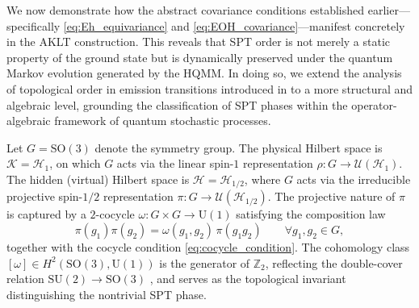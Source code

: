 \documentclass[12pt,a4paper]{article}
\begin{document}
We now demonstrate how the abstract covariance conditions established earlier—specifically \eqref{eq:Eh_equivariance} and \eqref{eq:EOH_covariance}—manifest concretely in the AKLT construction. This reveals that SPT order is not merely a static property of the ground state but is dynamically preserved under the quantum Markov evolution generated by the HQMM. In doing so, we extend the analysis of topological order in emission transitions introduced in \cite{SouAndhqmm2025} to a more structural and algebraic level, grounding the classification of SPT phases within the operator-algebraic framework of quantum stochastic processes.

Let $G = \mathrm{SO}(3)$ denote the symmetry group. The physical Hilbert space is $\mathcal{K} = \mathcal{H}_1$, on which $G$ acts via the linear spin-$1$ representation $\rho: G \to \mathcal{U}(\mathcal{H}_1)$. The hidden (virtual) Hilbert space is $\mathcal{H} = \mathcal{H}_{1/2}$, where $G$ acts via the irreducible projective spin-$1/2$ representation $\pi: G \to \mathcal{U}(\mathcal{H}_{1/2})$. The projective nature of $\pi$ is captured by a $2$-cocycle $\omega: G \times G \to \mathrm{U}(1)$ satisfying the composition law
\begin{equation}
\pi(g_1)\pi(g_2) = \omega(g_1,g_2)\,\pi(g_1g_2) \qquad \forall g_1,g_2 \in G,
\label{eq:aklt_proj_repr}
\end{equation}
together with the cocycle condition \eqref{eq:cocycle_condition}. The cohomology class $[\omega] \in H^2(\mathrm{SO}(3),\mathrm{U}(1))$ is the generator of $\mathbb{Z}_2$, reflecting the double-cover relation $\mathrm{SU}(2) \to \mathrm{SO}(3)$ \cite{Chen2011b, Ragone24}, and serves as the topological invariant distinguishing the nontrivial SPT phase.
\end{document}
